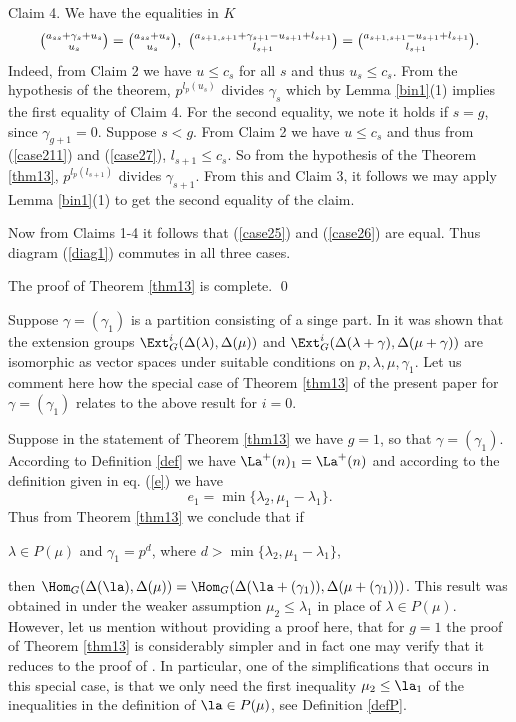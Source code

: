  Claim 4. We have the equalities in $K$ 
 \begin{equation*}\label{eq115}\tbinom{a_{ss} + \gamma_s + u_s}{u_s}=\tbinom{a_{ss}  + u_s}{u_s}, \  \tbinom{a_{s+1,s+1}+\gamma_{s+1}-u_{s+1}+l_{s+1}}{l_{s+1}}=\tbinom{a_{s+1,s+1}-u_{s+1}+l_{s+1}}{l_{s+1}}.\end{equation*}
 Indeed, from Claim 2 we have  $u \le c_s$ for all $s$ and thus $u_s \le c_s$. From the hypothesis of the theorem, $p^{l_p(u_s)}$ divides $\gamma_s$ which by Lemma \ref{bin1}(1) implies the first equality of Claim 4. For the second equality, we note it holds if $s=g$, since $\gamma_{g+1}=0$. Suppose $s<g$. From Claim 2 we have  $u \le c_s$ and thus from (\ref{case211}) and (\ref{case27}), $l_{s+1} \le c_s$. So from the hypothesis of the Theorem \ref{thm13}, $p^{l_p(l_{s+1})}$ divides $\gamma_{s+1}$. From this and Claim 3, it follows we may apply Lemma \ref{bin1}(1) to get the second equality of the claim.
 
 Now from Claims 1-4 it follows that (\ref{case25}) and (\ref{case26}) are equal. Thus diagram (\ref{diag1}) commutes in all three cases.
 
 The proof of Theorem \ref{thm13} is complete. \qed

\begin{rema} Suppose $\gamma=(\gamma_1)$ is a partition consisting of a singe part. In \cite{MS4} it was shown that the extension groups $\Ext^i_G(\Delta(\lambda), \Delta(\mu))$ and $\Ext^i_G(\Delta(\lambda + \gamma), \Delta(\mu +\gamma))$ are isomorphic as vector spaces under suitable conditions on $p, \lambda, \mu, \gamma_1$. Let us comment here how the special case of Theorem \ref{thm13} of the present paper for $\gamma = (\gamma_1)$ relates to the above result for $i=0$. 
	
	Suppose in the statement of Theorem \ref{thm13} we have $g=1$, so that $\gamma=(\gamma_1)$. According to Definition \ref{def} we have $\La^+(n)_1=\La^+(n)$ and according to the definition given in eq. (\ref{e}) we have \[e_1 =\min\{\lambda_{2}, \mu_1-\lambda_1\}.\] Thus from Theorem \ref{thm13} we conclude that if \begin{center}
		$\lambda \in P(\mu)$ and $\gamma_1 =p^d$, where $d > \min\{\lambda_{2}, \mu_1-\lambda_1\}$,
	\end{center} then $\Hom_G(\Delta(\la),\Delta(\mu)) = \Hom_{G}(\Delta(\la+(\gamma_1)), \Delta(\mu+(\gamma_1)))$. This result was obtained in \cite[Theorem 6.1]{MS4} under the weaker assumption $\mu_2 \le \lambda_1$ in place of $\lambda \in P(\mu)$.  However, let us mention without providing a proof here, that for $g=1$ the proof of Theorem \ref{thm13} is considerably simpler and in fact one may verify that it reduces to the proof of \cite[Theorem 6.1]{MS4}. In particular, one of the simplifications that occurs in this special case, is that we only need the first inequality $\mu_2 \le  \la_1$ of the inequalities in the definition of $\la \in P(\mu)$, see Definition \ref{defP}.
	\end{rema}
	
